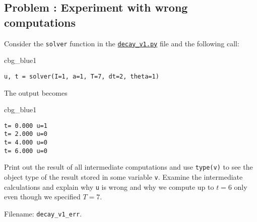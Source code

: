 \documentclass[graybox,sectrefs,envcountresetchap,open=right,final]{svmonodo}
\newenvironment{_cod_tight}[1]{
   \def\FrameCommand{\colorbox{#1}}
   \FrameRule0.6pt\MakeFramed {\FrameRestore}\vskip3mm}
   {\vskip0mm\endMakeFramed}
\newenvironment{cod}[1]{
\bgroup\rmfamily
\fboxsep=0mm\relax
\begin{_cod_tight}{#1}
\list{}{\parsep=-2mm\parskip=0mm\topsep=0pt\leftmargin=2mm
\rightmargin=2\leftmargin\leftmargin=4pt\relax}
\item\relax}
{\endlist\end{_cod_tight}\egroup}
\newenvironment{doconceexercise}{}{}
\newcounter{doconceexercisecounter}
\begin{document}
\begin{doconceexercise}

\subsection*{Problem \thedoconceexercisecounter: Experiment with wrong computations}

\label{decay:exer:decay1err}

Consider the \texttt{solver} function in the \href{{http://tinyurl.com/ofkw6kc/alg/decay_v1.py}}{\nolinkurl{decay_v1.py}} file
and the following call:

\begin{cod}{cbg_blue1}\begin{Verbatim}[numbers=none,fontsize=\fontsize{9pt}{9pt},baselinestretch=0.95,xleftmargin=2mm]
u, t = solver(I=1, a=1, T=7, dt=2, theta=1)
\end{Verbatim}
\end{cod}
\noindent
The output becomes

\begin{cod}{cbg_blue1}\begin{Verbatim}[numbers=none,fontsize=\fontsize{9pt}{9pt},baselinestretch=0.95,xleftmargin=2mm]
t= 0.000 u=1
t= 2.000 u=0
t= 4.000 u=0
t= 6.000 u=0
\end{Verbatim}
\end{cod}
\noindent
Print out the result of all intermediate computations and use
\texttt{type(v)} to see the object type of the result stored in some variable \texttt{v}.
Examine the intermediate calculations and explain
why \texttt{u} is wrong and why we compute up to $t=6$ only even though we
specified $T=7$.


\noindent Filename: \Verb!decay_v1_err!.

\end{doconceexercise}
\end{document}
